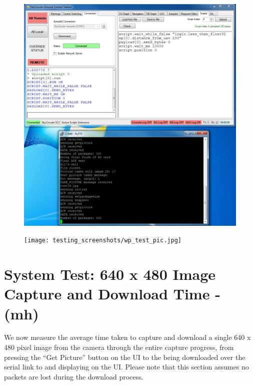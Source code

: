 \begin{figure}[H]
        \centering
        \includegraphics[width=1.0\textwidth]{testing_screenshots/wp_test.png}
        \label{fig:test_wp}
\end{figure}

\begin{figure}[H]
        \centering
        \texttt{[image: testing\_screenshots/wp\_test\_pic.jpg]}
        \label{fig:test_wp_pic}
\end{figure}

\section{System Test: 640 x 480 Image Capture and Download Time - (mh)}

We now measure the average time taken to capture and download a single 640 x 480
pixel image from the camera through the entire capture progress, from pressing the 
``Get Picture'' button on the UI to the being downloaded over the serial link to and
displaying on the UI. Please note that this section assumes no packets are lost during
the download process.


